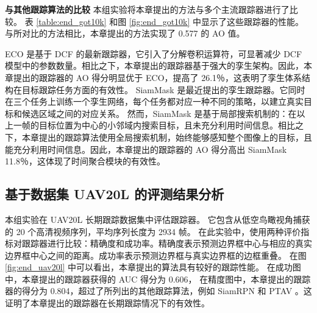 \textbf{与其他跟踪算法的比较}
本组实验将本章提出的方法与多个主流跟踪器进行了比较。
表 \ref{table:end_got10k} 和图 \ref{fig:end_got10k} 中显示了这些跟踪器的性能。
与所对比的方法相比，本章提出的方法实现了 0.577 的 AO 值。

ECO \cite{danelljan2017eco} 是基于 DCF 的最新跟踪器，它引入了分解卷积运算符，可显著减少 DCF 模型中的参数数量。相比之下，本章提出的跟踪器基于强大的孪生架构。因此，本章提出的跟踪器的 AO 得分明显优于 ECO，提高了 26.1％，这表明了孪生体系结构在目标跟踪任务方面的有效性。
SiamMask \cite{Wang2018SiamMask} 是最近提出的孪生跟踪器。它同时在三个任务上训练一个孪生网络，每个任务都对应一种不同的策略，以建立真实目标和候选区域之间的对应关系。
然而，SiamMask 是基于局部搜索机制的：在以上一帧的目标位置为中心的小邻域内搜索目标，且未充分利用时间信息。相比之下，本章提出的跟踪算法使用全局搜索机制，始终能够感知整个图像上的目标，且能充分利用时间信息。因此，本章提出的跟踪器的 AO 得分高出 SiamMask 11.8％，这体现了时间聚合模块的有效性。

\subsection{基于数据集 UAV20L 的评测结果分析}
本组实验在 UAV20L \cite{mueller2016benchmark} 长期跟踪数据集中评估跟踪器。
它包含从低空鸟瞰视角捕获的 20 个高清视频序列，平均序列长度为 2934 帧。
在此实验中，使用两种评价指标对跟踪器进行比较：精确度和成功率。精确度表示预测边界框中心与相应的真实边界框中心之间的距离。成功率表示预测边界框与真实边界框的边框重叠。
在图 \ref{fig:end_uav20l} 中可以看出，本章提出的算法具有较好的跟踪性能。
在成功图中，本章提出的跟踪器获得的 AUC 得分为 0.606，
在精度图中，本章提出的跟踪器的得分为 0.804，超过了所列出的其他跟踪算法，例如 SiamRPN \cite{SiamRPN} 和 PTAV \cite{fan2018parallel}。这证明了本章提出的跟踪器在长期跟踪情况下的有效性。

